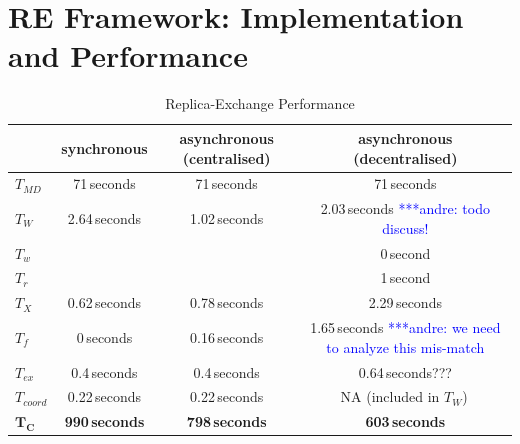 \documentclass{rspublic}
\newcommand{\jhanote}[1]{ {\textcolor{red} { ***shantenu: #1 }}}
\newcommand{\alnote}[1]{ {\textcolor{blue} { ***andre: #1 }}}
\newcommand{\athotanote}[1]{ {\textcolor{green} { ***athota: #1 }}}
\newcommand{\alnote}[1]{}
\newcommand{\athotanote}[1]{}
\newcommand{\jhanote}[1]{}
\begin{document}
\section{RE Framework: Implementation and Performance}
\label{sec:re_impl}

\begin{table}
    \centering
	\begin{tabular}{|l|c|c|c|}
	\hline
	                        &synchronous  &asynchronous (centralised) &asynchronous (decentralised)\\
	\hline
	$T_{MD}$       &71\,seconds &71\,seconds &71\,seconds\\
	\hline
	\hline
	$T_{W}$        &2.64\,seconds &1.02\,seconds &2.03\,seconds\alnote{todo discuss!}\\
	\hline
	\hspace{2mm}$T_{w}$ &&&0\,second\\ 
	\hline
	\hspace{2mm}$T_{r}$ &&&1\,second\\
	\hline\hline
	$T_{X}$        &0.62\,seconds &0.78\,seconds &2.29\,seconds\\
	\hline
	\hspace{2mm}$T_{f}$        &0\,seconds   &0.16\,seconds &1.65\,seconds \alnote{we need to analyze this mis-match}\\
	\hline
	\hspace{2mm}$T_{ex}$       &0.4\,seconds &0.4\,seconds &0.64\,seconds???\\
	\hline
    \hspace{2mm}$T_{coord}$    &0.22\,seconds &0.22\,seconds    &NA (included in $T_W$)\,\\
	\hline
	\hline
	$\mathbf{T_{C}}$        &\textbf{990\,seconds} &\textbf{798\,seconds}    &\textbf{603\,seconds}\\
	\hline
    \end{tabular}
	\caption{Replica-Exchange Performance}
	\label{table:repex_perf}
\end{table}

\end{document}
